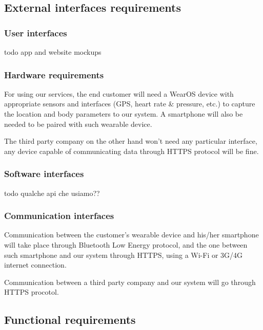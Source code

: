 \documentclass[../main.tex]{subfiles}
\begin{document}
\subsection{External interfaces requirements}

\subsubsection{User interfaces}

todo app and website mockups

\subsubsection{Hardware requirements}

For using our services, the end customer will need a WearOS device with appropriate sensors and interfaces (GPS, heart rate \& pressure, etc.) to capture the location and body parameters to our system. A smartphone will also be needed to be paired with such wearable device.

The third party company on the other hand won't need any particular interface, any device capable of communicating data through HTTPS protocol will be fine.

\subsubsection{Software interfaces}

todo qualche api che usiamo??


\subsubsection{Communication interfaces}

Communication between the customer's wearable device and his/her smartphone will take place through Bluetooth Low Energy protocol, and the one between such smartphone and our system through HTTPS, using a Wi-Fi or 3G/4G internet connection.

Communication between a third party company and our system will go through HTTPS procotol.


\subsection{Functional requirements}
\end{document}
